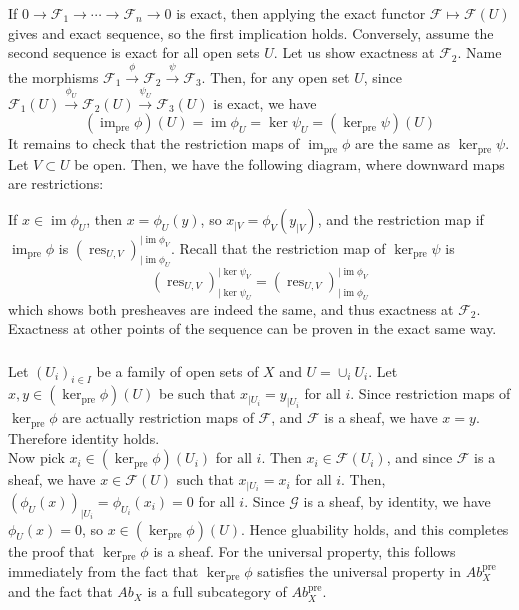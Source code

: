 \documentclass{article}
\newcommand{\pre}{\mathrm{pre}}
\newcommand{\Ab}{\mathit{Ab}}
\DeclareMathOperator{\im}{im}
\DeclareMathOperator{\res}{res}
\newcommand{\Fsheaf}{\mathscr{F}}
\newcommand{\Gsheaf}{\mathscr{G}}
\newcommand{\exercise}{\subsubsection} %
\begin{document}
\exercise{} If $0 \to \Fsheaf_1 \to \cdots \to \Fsheaf_n \to 0$ is exact, then applying the exact functor $\Fsheaf \mapsto \Fsheaf(U)$ gives and exact sequence, so the first implication holds. Conversely, assume the second sequence is exact for all open sets $U$. Let us show exactness at $\Fsheaf_2$. Name the morphisms $\Fsheaf_1 \xrightarrow{\phi} \Fsheaf_2 \xrightarrow{\psi} \Fsheaf_3$. Then, for any open set $U$, since $\Fsheaf_1(U) \xrightarrow{\phi_U} \Fsheaf_2(U) \xrightarrow{\psi_U} \Fsheaf_3(U)$ is exact, we have
\[(\im_\pre \phi)(U) = \im \phi_U = \ker \psi_U = (\ker_\pre \psi)(U)\]
It remains to check that the restriction maps of $\im_\pre \phi$ are the same as $\ker_\pre \psi$. Let $V \subset U$ be open. Then, we have the following diagram, where downward maps are restrictions:
\begin{center}
\end{center}
If $x \in \im \phi_U$, then $x = \phi_U (y)$, so $x_{\mid V} = \phi_V(y_{\mid V})$, and the restriction map if $\im_\pre \phi$ is $(\res_{U,V})_{\mid \im \phi_U}^{\mid \im \phi_V}$. Recall that the restriction map of $\ker_\pre \psi$ is
\[(\res_{U,V})_{\mid \ker \psi_U}^{\mid \ker \psi_V} = (\res_{U,V})_{\mid \im \phi_U}^{\mid \im \phi_V}\]
which shows both presheaves are indeed the same, and thus exactness at $\Fsheaf_2$. Exactness at other points of the sequence can be proven in the exact same way.

\exercise{} Let $(U_i)_{i\in I}$ be a family of open sets of $X$ and $U = \cup_i U_i$. Let $x,y \in (\ker_\pre \phi) (U)$ be such that $x_{\mid U_i} = y_{\mid U_i}$ for all $i$. Since restriction maps of $\ker_\pre \phi$ are actually restriction maps of $\Fsheaf$, and $\Fsheaf$ is a sheaf, we have $x = y$. Therefore identity holds. \\
Now pick $x_i \in (\ker_\pre \phi)(U_i)$ for all $i$. Then $x_i \in \Fsheaf(U_i)$, and since $\Fsheaf$ is a sheaf, we have $x \in \Fsheaf(U)$ such that $x_{\mid U_i} = x_i$ for all $i$. Then, $(\phi_U (x))_{\mid U_i} = \phi_{U_i} (x_i) = 0$ for all $i$. Since $\Gsheaf$ is a sheaf, by identity, we have $\phi_U(x) = 0$, so $x \in (\ker_\pre \phi)(U)$. Hence gluability holds, and this completes the proof that $\ker_\pre \phi$ is a sheaf. For the universal property, this follows immediately from the fact that $\ker_\pre \phi$ satisfies the universal property in $\Ab_X^\pre$ and the fact that $\Ab_X$ is a full subcategory of $\Ab^\pre_X$.
\end{document}
